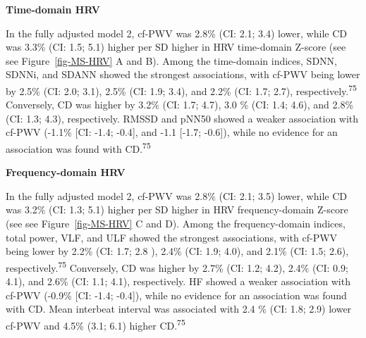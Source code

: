 \documentclass[
  letterpaper,
  headsepline=true,
  open=any]{scrbook}
\begin{document}
\textbf{Time-domain HRV}

In the fully adjusted model 2, cf-PWV was 2.8\% (CI: 2.1; 3.4) lower,
while CD was 3.3\% (CI: 1.5; 5.1) higher per SD higher in HRV
time-domain Z-score (see see Figure~\ref{fig-MS-HRV} A and B). Among the
time-domain indices, SDNN, SDNNi, and SDANN showed the strongest
associations, with cf-PWV being lower by 2.5\% (CI: 2.0; 3.1), 2.5\%
(CI: 1.9; 3.4), and 2.2\% (CI: 1.7; 2.7),
respectively.\textsuperscript{75} Conversely, CD was higher by 3.2\%
(CI: 1.7; 4.7), 3.0 \% (CI: 1.4; 4.6), and 2.8\% (CI: 1.3; 4.3),
respectively. RMSSD and pNN50 showed a weaker association with cf-PWV
(-1.1\% {[}CI: -1.4; -0.4{]}, and -1.1 {[}-1.7; -0.6{]}), while no
evidence for an association was found with CD.\textsuperscript{75}

\textbf{Frequency-domain HRV}

In the fully adjusted model 2, cf-PWV was 2.8\% (CI: 2.1; 3.5) lower,
while CD was 3.2\% (CI: 1.3; 5.1) higher per SD higher in HRV
frequency-domain Z-score (see see Figure~\ref{fig-MS-HRV} C and D).
Among the frequency-domain indices, total power, VLF, and ULF showed the
strongest associations, with cf-PWV being lower by 2.2\% (CI: 1.7; 2.8
), 2.4\% (CI: 1.9; 4.0), and 2.1\% (CI: 1.5; 2.6),
respectively.\textsuperscript{75} Conversely, CD was higher by 2.7\%
(CI: 1.2; 4.2), 2.4\% (CI: 0.9; 4.1), and 2.6\% (CI: 1.1; 4.1),
respectively. HF showed a weaker association with cf-PWV (-0.9\% {[}CI:
-1.4; -0.4{]}), while no evidence for an association was found with CD.
Mean interbeat interval was associated with 2.4 \% (CI: 1.8; 2.9) lower
cf-PWV and 4.5\% (3.1; 6.1) higher CD.\textsuperscript{75}
\end{document}
